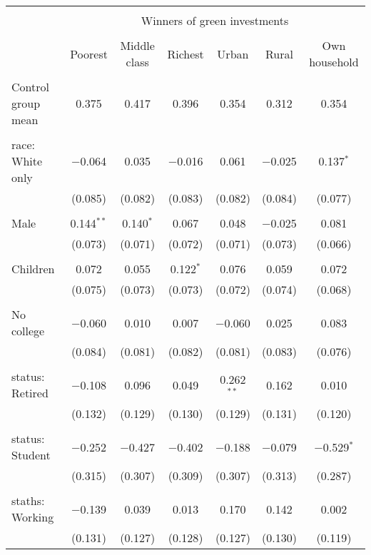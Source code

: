 
\begin{tabular}{@{\extracolsep{5pt}}lcccccc} 
\\[-1.8ex]\hline 
\hline \\[-1.8ex] 
 & \multicolumn{6}{c}{Winners of green investments} \\ 
\cline{2-7} 
\\[-1.8ex] & Poorest & Middle class & Richest & Urban & Rural & Own household \\ 
\hline \\[-1.8ex] 
 Control group mean & 0.375 & 0.417 & 0.396 & 0.354 & 0.312 & 0.354  \\ \hline \\[-1.8ex] race: White only & $-$0.064 & 0.035 & $-$0.016 & 0.061 & $-$0.025 & 0.137$^{*}$ \\ 
  & (0.085) & (0.082) & (0.083) & (0.082) & (0.084) & (0.077) \\ 
  & & & & & & \\ 
 Male & 0.144$^{**}$ & 0.140$^{*}$ & 0.067 & 0.048 & $-$0.025 & 0.081 \\ 
  & (0.073) & (0.071) & (0.072) & (0.071) & (0.073) & (0.066) \\ 
  & & & & & & \\ 
 Children & 0.072 & 0.055 & 0.122$^{*}$ & 0.076 & 0.059 & 0.072 \\ 
  & (0.075) & (0.073) & (0.073) & (0.072) & (0.074) & (0.068) \\ 
  & & & & & & \\ 
 No college & $-$0.060 & 0.010 & 0.007 & $-$0.060 & 0.025 & 0.083 \\ 
  & (0.084) & (0.081) & (0.082) & (0.081) & (0.083) & (0.076) \\ 
  & & & & & & \\ 
 status: Retired & $-$0.108 & 0.096 & 0.049 & 0.262$^{**}$ & 0.162 & 0.010 \\ 
  & (0.132) & (0.129) & (0.130) & (0.129) & (0.131) & (0.120) \\ 
  & & & & & & \\ 
 status: Student & $-$0.252 & $-$0.427 & $-$0.402 & $-$0.188 & $-$0.079 & $-$0.529$^{*}$ \\ 
  & (0.315) & (0.307) & (0.309) & (0.307) & (0.313) & (0.287) \\ 
  & & & & & & \\ 
 staths: Working & $-$0.139 & 0.039 & 0.013 & 0.170 & 0.142 & 0.002 \\ 
  & (0.131) & (0.127) & (0.128) & (0.127) & (0.130) & (0.119) \\ 

\end{tabular}
